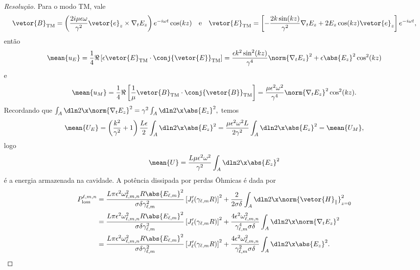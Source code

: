 \begin{proof}[Resolução]
    Para o modo TM, vale
    \begin{equation*}
        \vetor{B}_\mathrm{TM} = \left(\frac{2i \mu \epsilon \omega}{\gamma^2} \vetor{e}_z \times \nabla_t E_z\right) e^{- i\omega t} \cos(kz)
        \quad\text{e}\quad
        \vetor{E}_\mathrm{TM} = \left[-\frac{2k \sin(kz)}{\gamma^2} \nabla_t E_z + 2E_z \cos(kz)\vetor{e}_z\right]e^{-i\omega t},
    \end{equation*}
    então
    \begin{equation*}
        \mean{u_E} = \frac14 \Re\left[\epsilon\vetor{E}_\mathrm{TM} \cdot \conj{\vetor{E}}_\mathrm{TM}\right] = \frac{\epsilon k^2 \sin^2(kz)}{\gamma^4}\norm{\nabla_t E_z}^2 + \epsilon\abs{E_z}^2 \cos^2(kz)
    \end{equation*}
    e
    \begin{equation*}
        \mean{u_M} = \frac14 \Re\left[\frac{1}{\mu} \vetor{B}_\mathrm{TM} \cdot \conj{\vetor{B}}_\mathrm{TM}\right] = \frac{\mu \epsilon^2 \omega^2}{\gamma^4} \norm{\nabla_t E_z}^2 \cos^2(kz).
    \end{equation*}
    Recordando que \(\int_A \dln2\x \norm{\nabla_t E_z}^2 = \gamma^2 \int_A \dln2\x \abs{E_z}^2,\) temos
    \begin{equation*}
        \mean{U_E} = \left(\frac{k^2}{\gamma^2} + 1\right)\frac{L \epsilon}{2} \int_A \dln2\x \abs{E_z}^2 = \frac{\mu \epsilon^2 \omega^2 L}{2\gamma^2} \int_A \dln2\x \abs{E_z}^2 = \mean{U_M},
    \end{equation*}
    logo
    \begin{equation*}
        \mean{U} = \frac{L \mu \epsilon^2 \omega^2}{\gamma^2} \int_A \dln2\x \abs{E_z}^2
    \end{equation*}
    é a energia armazenada na cavidade. A potência dissipada por perdas Ôhmicas é dada por
    \begin{align*}
        P^{\ell,m,n}_\mathrm{loss} &= \frac{L \pi \epsilon^2 \omega_{\ell,m,n}^2 R \abs{E_{\ell,m}}^2}{\sigma \delta \gamma_{\ell,m}^2} \left[J_\ell'(\gamma_{\ell,m} R)\right]^2 + \frac{2}{2 \sigma \delta} \int_A \dln2\x \norm{\vetor{H}_\parallel}_{z = 0}^2\\
                        &= \frac{L \pi \epsilon^2 \omega_{\ell,m,n}^2 R \abs{E_{\ell,m}}^2}{\sigma \delta \gamma_{\ell,m}^2} \left[J_\ell'(\gamma_{\ell,m} R)\right]^2 + \frac{4 \epsilon^2 \omega_{\ell,m,n}^2}{\gamma_{\ell,m}^4 \sigma \delta} \int_A \dln2\x \norm{\nabla_t E_z}^2\\
                        &= \frac{L \pi \epsilon^2 \omega_{\ell,m,n}^2 R \abs{E_{\ell,m}}^2}{\sigma \delta \gamma_{\ell,m}^2} \left[J_\ell'(\gamma_{\ell,m} R)\right]^2 + \frac{4 \epsilon^2 \omega_{\ell,m,n}^2}{\gamma_{\ell,m}^2 \sigma \delta} \int_A \dln2\x \abs{E_z}^2.

\end{align*}
\end{proof}
